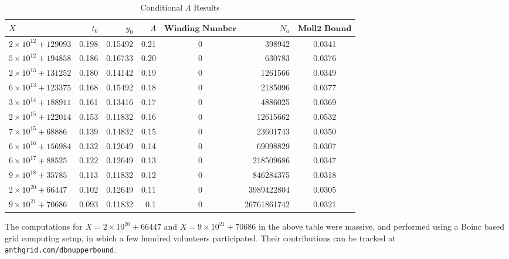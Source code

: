 \begin{table}[h!]
  \begin{center}
    \caption{Conditional $\Lambda$ Results}
    \label{tab:table1}
    \begin{tabular}{l|r|r|r|c|r|c} %
      $X$ & $t_{0}$ & $y_{0}$ & $\Lambda$ & $\textbf{Winding Number}$ & $N_{a}$ & $\textbf{Moll2 Bound}$\\
      \hline
      $2 \times 10^{12} + 129093$ & 0.198 & 0.15492 & 0.21 & 0 & 398942 & 0.0341\\
      $5 \times 10^{12} + 194858$ & 0.186 & 0.16733 & 0.20 & 0 & 630783 & 0.0376\\
      $2 \times 10^{13} + 131252$ & 0.180 & 0.14142 & 0.19 & 0 & 1261566 & 0.0349\\
      $6 \times 10^{13} + 123375$ & 0.168 & 0.15492 & 0.18 & 0 & 2185096 & 0.0377\\
      $3 \times 10^{14} + 188911$ & 0.161 & 0.13416 & 0.17 & 0 & 4886025 & 0.0369\\
      $2 \times 10^{15} + 122014$ & 0.153 & 0.11832 & 0.16 & 0 & 12615662 & 0.0532\\
      $7 \times 10^{15} + 68886$ & 0.139 & 0.14832 & 0.15 & 0 & 23601743 & 0.0350\\
      $6 \times 10^{16} + 156984$ & 0.132 & 0.12649 & 0.14 & 0 & 69098829 & 0.0307\\
      $6 \times 10^{17} + 88525$ & 0.122 & 0.12649 & 0.13 & 0 & 218509686 & 0.0347\\
      $9 \times 10^{18} + 35785$ & 0.113 & 0.11832 & 0.12 & 0 & 846284375 & 0.0318\\
      $2 \times 10^{20} + 66447$ & 0.102 & 0.12649 & 0.11 & 0 & 3989422804 & 0.0305\\
      $9 \times 10^{21} + 70686$ & 0.093 & 0.11832 & 0.1 & 0 & 26761861742 & 0.0321\\
    \end{tabular}
  \end{center}
\end{table}

The computations for $X=2 \times 10^{20} + 66447$ and $X=9 \times 10^{21} + 70686$ in the above table were massive, and performed using a Boinc based grid computing setup, in which a few hundred volunteers participated. Their contributions can be tracked at {\tt anthgrid.com/dbnupperbound}.

